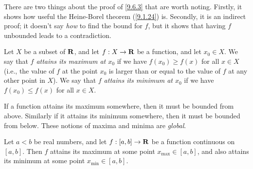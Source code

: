 \begin{remark}\label{9.6.4}
  There are two things about the proof of \cref{9.6.3} that are worth noting.
  Firstly, it shows how useful the Heine-Borel theorem (\cref{9.1.24}) is.
  Secondly, it is an indirect proof;
  it doesn't say \emph{how} to find the bound for \(f\), but it shows that having \(f\) unbounded leads to a contradiction.
\end{remark}

\begin{definition}\label{9.6.5}
  Let \(X\) be a subset of \(\mathbf{R}\), and let \(f : X \to \mathbf{R}\) be a function, and let \(x_0 \in X\).
  We say that \emph{\(f\) attains its maximum at \(x_0\)} if we have \(f(x_0) \geq f(x)\) for all \(x \in X\)
  (i.e., the value of \(f\) at the point \(x_0\) is larger than or equal to the value of \(f\) at any other point in \(X\)).
  We say that \emph{\(f\) attains its minimum at \(x_0\)} if we have \(f(x_0) \leq f(x)\) for all \(x \in X\).
\end{definition}

\begin{remark}\label{9.6.6}
  If a function attains its maximum somewhere, then it must be bounded from above.
  Similarly if it attains its minimum somewhere, then it must be bounded from below.
  These notions of maxima and minima are \emph{global}.
\end{remark}

\begin{proposition}\label{9.6.7}
  Let \(a < b\) be real numbers, and let \(f : [a, b] \to \mathbf{R}\) be a function continuous on \([a, b]\).
  Then \(f\) attains its maximum at some point \(x_{\max} \in [a, b]\), and also attains its minimum at some point \(x_{\min} \in [a, b]\).
\end{proposition}

